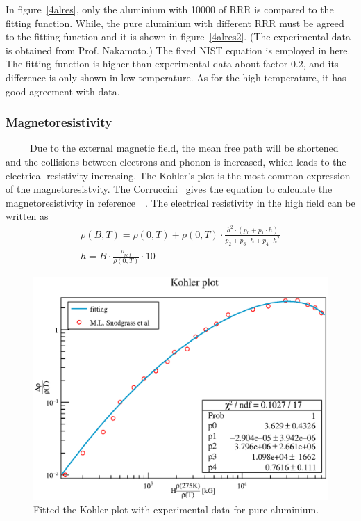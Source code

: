 In figure~\ref{4alres}, only the aluminium with 10000 of RRR is compared to the fitting function.
While, the pure aluminium with different RRR must be agreed to the fitting function and it is shown in figure~\ref{4alres2}.
(The experimental data is obtained from Prof. Nakamoto.)
The fixed NIST equation is employed in here.
The fitting function is higher than experimental data about factor 0.2, and its difference is only shown in low temperature.
As for the high temperature, it has good agreement with data.

  \subsubsection{Magnetoresistivity}
~~~~~Due to the external magnetic field, the mean free path will be shortened and the collisions between electrons and phonon is increased, which leads to the electrical resistivity increasing.
The Kohler's plot is the most common expression of the magnetoresistvity.
The Corruccini~\cite{corr} gives the equation to calculate the magnetoresistivity in reference~\cite{fick}~\cite{arp}.
The electrical resistivity in the high field can be written as
\begin{gather}
 \rho(B, T) = \rho(0, T) + \rho(0, T) \cdot \frac{h^2 \cdot (p_0 + p_1 \cdot h)}{p_2 + p_3\cdot h + p_4 \cdot h^2} \\
 h = B \cdot \frac{\rho_{ref}}{\rho(0, T)} \cdot 10
\end{gather}
\begin{figure}[H]
 \centering
 \includegraphics[scale=0.45]{chapter5/fig/Magnetores.eps}
 \caption{Fitted the Kohler plot with experimental data for pure aluminium.}
 \label{4magres}
\end{figure}
